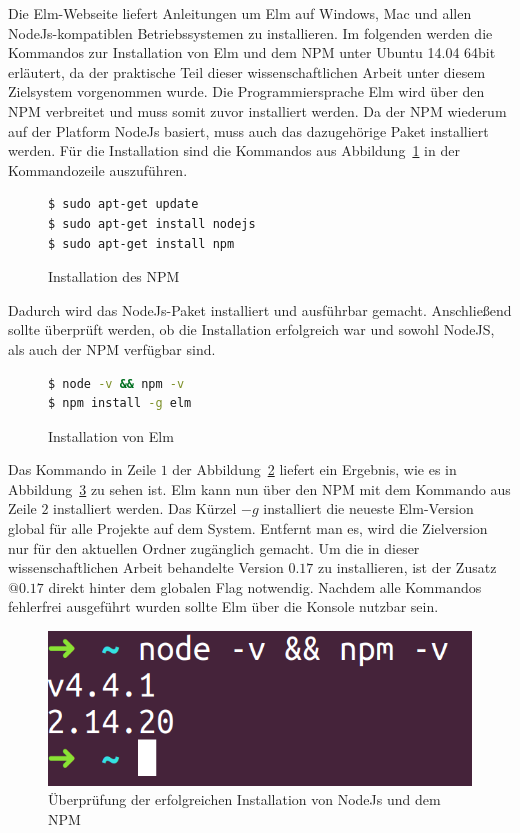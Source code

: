Die Elm-Webseite liefert Anleitungen um Elm auf Windows, Mac und allen NodeJs-kompatiblen Betriebssystemen zu installieren. Im folgenden werden die Kommandos zur Installation von Elm und dem \ac{NPM} unter Ubuntu 14.04 64bit erläutert, da der praktische Teil dieser wissenschaftlichen Arbeit unter diesem Zielsystem vorgenommen wurde.
Die Programmiersprache Elm wird über den \ac{NPM} verbreitet und muss somit zuvor installiert werden. Da der \ac{NPM} wiederum auf der Platform NodeJs basiert, muss auch das dazugehörige Paket installiert werden. Für die Installation sind die Kommandos aus Abbildung~\ref{fig:npm-install} in der Kommandozeile auszuführen.
\begin{figure}[h]
\begin{lstlisting}[language=bash]
$ sudo apt-get update
$ sudo apt-get install nodejs
$ sudo apt-get install npm
\end{lstlisting}
\caption{Installation des \ac{NPM}}\label{fig:npm-install}
\end{figure}
Dadurch wird das NodeJs-Paket installiert und ausführbar gemacht. Anschließend sollte überprüft werden, ob die Installation erfolgreich war und sowohl NodeJS, als auch der \ac{NPM} verfügbar sind.
\begin{figure}[h]
\begin{lstlisting}[language=bash]
$ node -v && npm -v
$ npm install -g elm
\end{lstlisting}
\caption{Installation von Elm}\label{fig:npm-install-check}
\end{figure}
Das Kommando in Zeile $1$ der Abbildung~\ref{fig:npm-install-check} liefert ein Ergebnis, wie es in Abbildung~\ref{fig:npm-installed} zu sehen ist. Elm kann nun über den \ac{NPM} mit dem Kommando aus Zeile $2$ installiert werden. Das Kürzel $-g$ installiert die neueste Elm-Version global für alle Projekte auf dem System. Entfernt man es, wird die Zielversion nur für den aktuellen Ordner zugänglich gemacht. Um die in dieser wissenschaftlichen Arbeit behandelte Version $0.17$ zu installieren, ist der Zusatz $@0.17$ direkt hinter dem globalen Flag notwendig. Nachdem alle Kommandos fehlerfrei ausgeführt wurden sollte Elm über die Konsole nutzbar sein.
\begin{figure}[hb]
\centering
\includegraphics[scale=0.3]{img/npm-nodejs-installation.png}
\caption{Überprüfung der erfolgreichen Installation von NodeJs und dem \ac{NPM}}\label{fig:npm-installed}
\end{figure}



